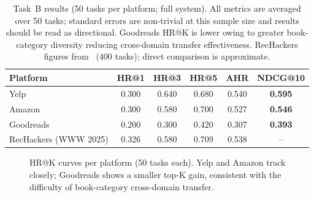 \documentclass[11pt]{article}
\begin{document}
\begin{table}[t]
\centering
\setlength{\tabcolsep}{6pt}
\renewcommand{\arraystretch}{1.08}
\begin{tabular}{lccccc}
\toprule
\textbf{Platform} & \textbf{HR@1} & \textbf{HR@3} & \textbf{HR@5}
                  & \textbf{AHR} & \textbf{NDCG@10} \\
\midrule
Yelp      & 0.300 & 0.640 & 0.680 & 0.540 & \textbf{0.595} \\
Amazon    & 0.300 & 0.580 & 0.700 & 0.527 & \textbf{0.546} \\
Goodreads & 0.200 & 0.300 & 0.420 & 0.307 & \textbf{0.393} \\
\midrule
RecHackers (WWW 2025) & 0.326 & 0.580 & 0.709 & 0.538 & -- \\
\bottomrule
\end{tabular}
\caption{Task~B results (50 tasks per platform; full system).
  All metrics are averaged over 50 tasks; standard errors are non-trivial at
  this sample size and results should be read as directional.
  Goodreads HR@K is lower owing to greater book-category diversity reducing
  cross-domain transfer effectiveness.
  RecHackers figures from~\citet{guo2025agentsocietychallenge} (400 tasks);
  direct comparison is approximate.}
\label{tab:main_results}
\end{table}
\FloatBarrier

\begin{figure}[h]
\centering
{}
\caption{HR@K curves per platform (50 tasks each).
  Yelp and Amazon track closely; Goodreads shows a smaller top-K gain,
  consistent with the difficulty of book-category cross-domain transfer.}
\label{fig:hr_chart}
\end{figure}
\end{document}
